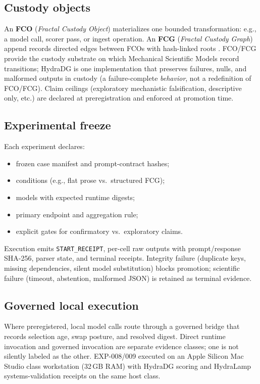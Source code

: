 \documentclass{article}
\begin{document}
\subsection{Custody objects}

An \textbf{FCO} (\emph{Fractal Custody Object}) materializes one bounded transformation: e.g., a model call, scorer pass, or ingest operation.
An \textbf{FCG} (\emph{Fractal Custody Graph}) append records directed edges between FCOs with hash-linked roots \cite{laurie2013ct}.
FCO/FCG provide the custody substrate on which Mechanical Scientific Models record transitions; HydraDG is one implementation that preserves failures, nulls, and malformed outputs in custody (a failure-complete \emph{behavior}, not a redefinition of FCO/FCG).
Claim ceilings (exploratory mechanistic falsification, descriptive only, etc.) are declared at preregistration and enforced at promotion time.

\subsection{Experimental freeze}

Each experiment declares:
\begin{itemize}
  \item frozen case manifest and prompt-contract hashes;
  \item conditions (e.g., flat prose vs.\ structured FCG);
  \item models with expected runtime digests;
  \item primary endpoint and aggregation rule;
  \item explicit gates for confirmatory vs.\ exploratory claims.
\end{itemize}
Execution emits \texttt{START\_RECEIPT}, per-cell raw outputs with prompt/response SHA-256, parser state, and terminal receipts.
Integrity failure (duplicate keys, missing dependencies, silent model substitution) blocks promotion; scientific failure (timeout, abstention, malformed JSON) is retained as terminal evidence.

\subsection{Governed local execution}

Where preregistered, local model calls route through a governed bridge that records selection age, swap posture, and resolved digest.
Direct runtime invocation and governed invocation are separate evidence classes; one is not silently labeled as the other.
EXP-008/009 executed on an Apple Silicon Mac Studio class workstation (32\,GB RAM) with HydraDG scoring and HydraLamp systems-validation receipts on the same host class.
\end{document}
